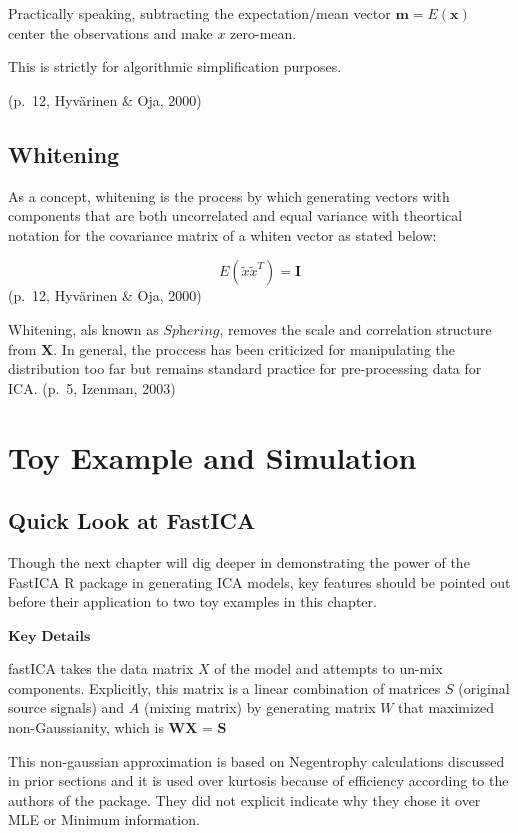 \documentclass[12pt,twoside]{amherstthesis}
\begin{document}
  Practically speaking, subtracting the expectation/mean vector
  \(\textbf{m} = E({\textbf{x}})\) center the observations and make \(x\)
  zero-mean.
  
  This is strictly for algorithmic simplification purposes.
  
  (p.~12, Hyvärinen \& Oja, 2000)
  
  \subsection{Whitening}\label{whitening}
  
  As a concept, whitening is the process by which generating vectors with
  components that are both uncorrelated and equal variance with theortical
  notation for the covariance matrix of a whiten vector as stated below:
  
  \[ E(\tilde{x} \tilde{x}^T)= \textbf{I} \] (p.~12, Hyvärinen \& Oja,
  2000)
  
  Whitening, als known as \(\textit{Sphering}\), removes the scale and
  correlation structure from \(\textbf{X}\). In general, the proccess has
  been criticized for manipulating the distribution too far but remains
  standard practice for pre-processing data for ICA. (p.~5, Izenman, 2003)
  
  \section{Toy Example and Simulation}\label{toy-example-and-simulation}
  
  \subsection{Quick Look at FastICA}\label{quick-look-at-fastica}
  
  Though the next chapter will dig deeper in demonstrating the power of
  the FastICA R package in generating ICA models, key features should be
  pointed out before their application to two toy examples in this
  chapter.
  
  \(\textbf{Key Details}\)
  
  fastICA takes the data matrix \(X\) of the model and attempts to un-mix
  components. Explicitly, this matrix is a linear combination of matrices
  \(S\) (original source signals) and \(A\) (mixing matrix) by generating
  matrix \(W\) that maximized non-Gaussianity, which is
  \(\textbf{WX = S}\)
  
  This non-gaussian approximation is based on Negentrophy calculations
  discussed in prior sections and it is used over kurtosis because of
  efficiency according to the authors of the package. They did not
  explicit indicate why they chose it over MLE or Minimum information.
  
\end{document}
